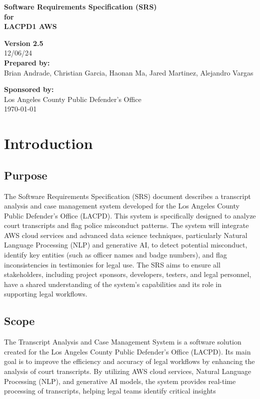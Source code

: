 \documentclass[12pt]{article}
\begin{document}
\begin{titlepage}
    \centering
    \vspace*{2cm}

    {\Huge\bfseries Software Requirements Specification (SRS)\\
    for\\
    LACPD1 AWS\\}

    \textbf{Version 2.5}\\
    12/06/24\\

    \textbf{Prepared by:}\\
    Brian Andrade, Christian Garcia, Haonan Ma, Jared Martinez, Alejandro Vargas

    \textbf{Sponsored by:}\\
    Los Angeles County Public Defender's Office\\

    \vfill
    {\large \today}
\end{titlepage}

\tableofcontents
\setcounter{tocdepth}{3}  


\newpage

\section{Introduction}
\subsection{Purpose}
The Software Requirements Specification (SRS) document describes a transcript analysis
 and case management system developed for the Los Angeles County Public Defender’s Office
 (LACPD). This system is specifically designed to analyze court transcripts and flag police
 misconduct patterns. The system will integrate AWS cloud services and advanced data science
 techniques, particularly Natural Language Processing (NLP) and generative AI, to detect
 potential misconduct, identify key entities (such as officer names and badge numbers), and flag
 inconsistencies in testimonies for legal use.
 The SRS aims to ensure all stakeholders, including project sponsors, developers, testers,
 and legal personnel, have a shared understanding of the system’s capabilities and its role in
 supporting legal workflows.


\subsection{Scope}
 The Transcript Analysis and Case Management System is a software solution created for
 the Los Angeles County Public Defender’s Office (LACPD). Its main goal is to improve the
 efficiency and accuracy of legal workflows by enhancing the analysis of court transcripts. By
 utilizing AWS cloud services, Natural Language Processing (NLP), and generative AI models,
 the system provides real-time processing of transcripts, helping legal teams identify critical
 insights
\end{document}
